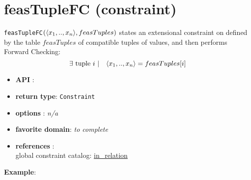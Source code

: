 \label{feastuplefc}
\hypertarget{feastuplefc}{}

\section{feasTupleFC (constraint)}\label{feastuplefc:feastuplefcconstraint}\hypertarget{feastuplefc:feastuplefcconstraint}{}
\begin{notedef}
  \texttt{feasTupleFC}$(\langle x_1,..,x_n\rangle,feasTuples)$ states an extensional constraint on  defined by the table $feasTuples$ of compatible tuples of values, and then performs Forward Checking:
      $$\exists \text{ tuple } i\ |\quad \langle x_1,..,x_n\rangle=feasTuples[i]$$
\end{notedef}


\begin{itemize}
	\item \textbf{API} : 
	\item \textbf{return type}: \texttt{Constraint}
	\item \textbf{options} : \emph{n/a}
	\item \textbf{favorite domain}: \emph{to complete}
	\item \textbf{references} :\\
      global constraint catalog: \href{http://www.emn.fr/x-info/sdemasse/gccat/Cin_relation.html}{in\_relation}
\end{itemize}

\textbf{Example}:

